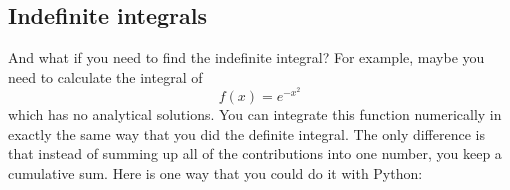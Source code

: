 %
%
%
%
%
%
%
%
%
%
%

\subsection*{Indefinite integrals}

And what if you need to find the indefinite integral? For example,
maybe you need to calculate the integral of 
\begin{equation}
f(x) = e^{-x^2}
\end{equation}
which has no analytical solutions. You can integrate this function
numerically in exactly the same way that you did the definite
integral.  The only difference is that instead of summing up all of
the contributions into one number, you keep a cumulative sum.  Here is
one way that you could do it with Python:

